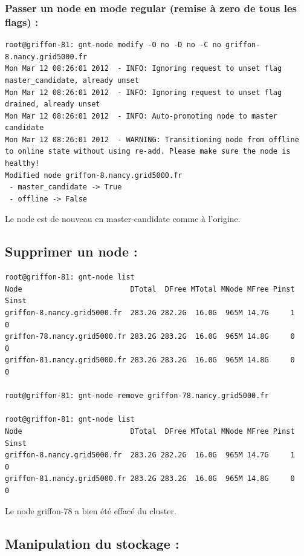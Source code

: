 \subsubsection {Passer un node en mode regular (remise à zero de tous les flags) :}
\begin{lstlisting}
root@griffon-81: gnt-node modify -O no -D no -C no griffon-8.nancy.grid5000.fr
Mon Mar 12 08:26:01 2012  - INFO: Ignoring request to unset flag master_candidate, already unset
Mon Mar 12 08:26:01 2012  - INFO: Ignoring request to unset flag drained, already unset
Mon Mar 12 08:26:01 2012  - INFO: Auto-promoting node to master candidate
Mon Mar 12 08:26:01 2012  - WARNING: Transitioning node from offline to online state without using re-add. Please make sure the node is healthy!
Modified node griffon-8.nancy.grid5000.fr
 - master_candidate -> True
 - offline -> False
\end{lstlisting}
Le node est de nouveau en master-candidate comme à l'origine.

\subsection {Supprimer un node :}
\begin{lstlisting}
root@griffon-81: gnt-node list
Node                         DTotal  DFree MTotal MNode MFree Pinst Sinst
griffon-8.nancy.grid5000.fr  283.2G 282.2G  16.0G  965M 14.7G     1     0
griffon-78.nancy.grid5000.fr 283.2G 283.2G  16.0G  965M 14.8G     0     0
griffon-81.nancy.grid5000.fr 283.2G 283.2G  16.0G  965M 14.8G     0     0

root@griffon-81: gnt-node remove griffon-78.nancy.grid5000.fr

root@griffon-81: gnt-node list
Node                         DTotal  DFree MTotal MNode MFree Pinst Sinst
griffon-8.nancy.grid5000.fr  283.2G 282.2G  16.0G  965M 14.7G     1     0
griffon-81.nancy.grid5000.fr 283.2G 283.2G  16.0G  965M 14.8G     0     0
\end{lstlisting}
Le node griffon-78 a bien été effacé du cluster.

\subsection {Manipulation du stockage :}

